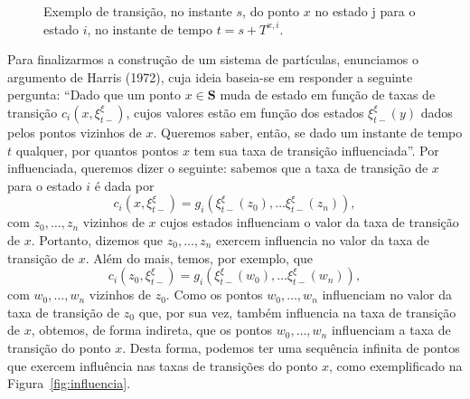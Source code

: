 \documentclass[twoside,openright,titlepage,numbers=noenddot,headinclude,  lineheaders footinclude=true,cleardoublepage=empty,
                                BCOR=5mm,paper=a4,fontsize=12pt ]{scrbook}
\theoremstyle{definition}
\begin{document}
\begin{figure}[ht] 
\centering
{}
\caption{Exemplo de transição, no instante $s$, do ponto $x$ no estado j
 para o estado $i$, no instante de tempo $t = s + T^{x,i}$.}
\label{fig:regra2}
\end{figure}


Para finalizarmos a construção de um sistema de partículas,
enunciamos o argumento de Harris (1972),
cuja ideia baseia-se em responder a seguinte pergunta:
``Dado que um ponto $x \in \mathbf{S}$ muda de estado
em função de taxas de 
transição $c_i(x, \xi^{\xi}_{t-})$,
cujos valores estão em função dos estados 
$\xi^{\xi}_{t-}(y)$ dados pelos pontos vizinhos de $x$.
Queremos saber, então, se dado um instante de tempo $t$ qualquer,
por quantos pontos  $x$ tem sua taxa de 
transição influenciada''. Por influenciada, queremos dizer
o seguinte: sabemos que a taxa de transição de $x$
para o estado $i$ é dada por
\[
c_i(x, \xi^{\xi}_{t-}) = g_i( \xi^{\xi}_{t-}(z_0), \ldots
							  \xi^{\xi}_{t-}(z_n) ),
\]
com $z_0, \ldots, z_n$ vizinhos de $x$ cujos estados
influenciam
o valor da taxa de transição de $x$. Portanto, dizemos
que $z_0, \ldots, z_n$ exercem influencia no valor da
taxa de transição de $x$. Além do mais, temos, por
exemplo, que
\[
c_i(z_0, \xi^{\xi}_{t-}) = g_i( \xi^{\xi}_{t-}(w_0), \ldots
							  \xi^{\xi}_{t-}(w_n) ),
\]
com $w_0, \ldots, w_n$ vizinhos de $z_0$. 
Como os pontos $w_0, \ldots, w_n$ influenciam no valor da taxa
de transição de $z_0$ que, por sua vez, também influencia
na taxa de transição de $x$, obtemos, de forma indireta,
que os pontos 
$w_0, \ldots, w_n$ influenciam a taxa de transição do ponto $x$.
Desta forma, podemos ter uma sequência infinita de pontos 
que exercem influência nas taxas de transições do ponto
$x$, como exemplificado na Figura~\ref{fig:influencia}.
\end{document}

